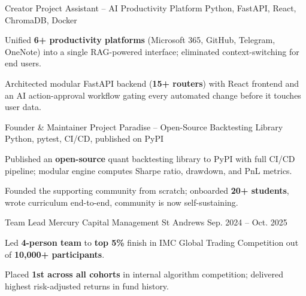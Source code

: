 

\begin{cventries}

  \cventry
    {Creator} %
    {Project Assistant -- AI Productivity Platform} %
    {Python, FastAPI, React, ChromaDB, Docker} %
    {} %
    {
      \begin{cvitems}
        \item {Unified \textbf{6+ productivity platforms} (Microsoft 365, GitHub, Telegram, OneNote) into a single RAG-powered interface; eliminated context-switching for end users.}
        \item {Architected modular FastAPI backend (\textbf{15+ routers}) with React frontend and an AI action-approval workflow gating every automated change before it touches user data.}
      \end{cvitems}
    }

  \cventry
    {Founder \& Maintainer} %
    {Project Paradise -- Open-Source Backtesting Library} %
    {Python, pytest, CI/CD, published on PyPI} %
    {} %
    {
      \begin{cvitems}
        \item {Published an \textbf{open-source} quant backtesting library to PyPI with full CI/CD pipeline; modular engine computes Sharpe ratio, drawdown, and PnL metrics.}
        \item {Founded the supporting community from scratch; onboarded \textbf{20+ students}, wrote curriculum end-to-end, community is now self-sustaining.}
      \end{cvitems}
    }

  \cventry
    {Team Lead} %
    {Mercury Capital Management} %
    {St Andrews} %
    {Sep. 2024 -- Oct. 2025} %
    {
      \begin{cvitems}
        \item {Led \textbf{4-person team} to \textbf{top 5\%} finish in IMC Global Trading Competition out of \textbf{10,000+ participants}.}
        \item {Placed \textbf{1st across all cohorts} in internal algorithm competition; delivered highest risk-adjusted returns in fund history.}
      \end{cvitems}
    }

\end{cventries}
